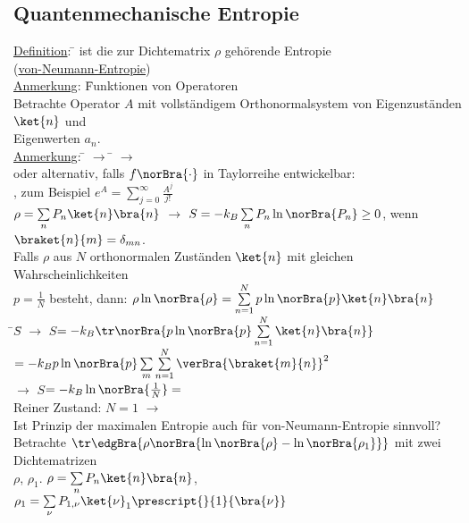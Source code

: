 \subsection{Quantenmechanische Entropie}
\begin{tabbing}
\uline{Definition}: \=  ist die zur Dichtematrix $\rho$ gehörende Entropie\\\> (\uline{von-Neumann-Entropie})\\
\uline{Anmerkung}: \= Funktionen von Operatoren\\
\> Betrachte Operator $A$ mit vollständigem Orthonormalsystem von Eigenzuständen $\ket{n}$ und\\\> Eigenwerten $a_n$.\\
\uline{Anmerkung}: \= $\rightarrow$ \= \kill
\> $\rightarrow$ \\
\> oder alternativ, falls $f\norBra{\cdot}$ in Taylorreihe entwickelbar:\\
\>\> , zum Beispiel $e^A = \sum\limits_{j=0}^\infty \frac{A^j}{j!}$\\
$\rho = \sum\limits_n P_n \ket{n}\bra{n}$ $\rightarrow$ $S=-k_B \sum\limits_n P_n \ln\norBra{P_n} \geq 0$, wenn $\braket{n}{m} = \delta_{mn}$.\\
Falls $\rho$ aus $N$ orthonormalen Zuständen $\ket{n}$ mit gleichen Wahrscheinlichkeiten\\ $p=\frac{1}{N}$ besteht, dann: $\rho\ln\norBra{\rho} = \sum\limits_{n=1}^N p \ln\norBra{p} \ket{n}\bra{n}$\\
\hspace{4em} \=$S$\= \kill
$\rightarrow$\> $S$\>$= - k_B \tr\norBra{p\ln\norBra{p} \sum\limits_{n=1}^N \ket{n}\bra{n}}$\\
\>\>$=-k_B p \ln\norBra{p} \sum\limits_m \sum\limits_{n=1}^N \verBra{\braket{m}{n}}^2$\\
$\rightarrow$\> $S$\>$=-k_B\ln\norBra{\frac{1}{N}} =$\\
Reiner Zustand: $N=1$ $\rightarrow$ \\
Ist Prinzip der maximalen Entropie auch für von-Neumann-Entropie sinnvoll?\\
Betrachte $\tr\edgBra{\rho\norBra{\ln\norBra{\rho}-\ln\norBra{\rho_1}}}$ mit zwei Dichtematrizen\\
$\rho$, $\rho_1$. $\rho = \sum\limits_n P_n \ket{n}\bra{n}$, $\rho_1=\sum\limits_\nu P_{1,\nu} \ket{\nu}_1 \prescript{}{1}{\bra{\nu}}$\\

\end{tabbing}
